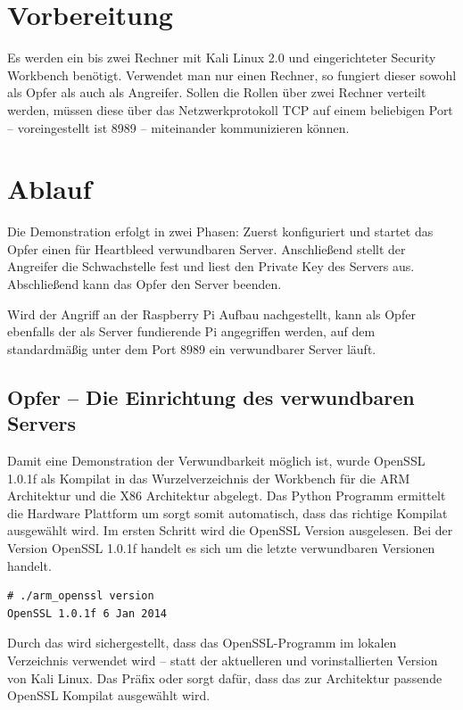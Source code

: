 \section{Vorbereitung}
%
Es werden ein bis zwei Rechner mit Kali Linux 2.0 und eingerichteter Security Workbench benötigt. Verwendet man nur einen Rechner, so fungiert dieser sowohl als Opfer als auch als Angreifer. Sollen die Rollen über zwei Rechner verteilt werden, müssen diese über das Netzwerkprotokoll TCP auf einem beliebigen Port -- voreingestellt ist 8989 -- miteinander kommunizieren können.

\section{Ablauf}
Die Demonstration erfolgt in zwei Phasen: Zuerst konfiguriert und startet das Opfer einen für Heartbleed verwundbaren Server. Anschließend stellt der Angreifer die Schwachstelle fest und liest den Private Key des Servers aus. Abschließend kann das Opfer den Server beenden.

Wird der Angriff an der Raspberry Pi Aufbau nachgestellt, kann als Opfer ebenfalls der als Server fundierende Pi angegriffen werden, auf dem standardmäßig unter dem Port 8989 ein verwundbarer Server läuft.

\subsection{Opfer -- Die Einrichtung des verwundbaren Servers}

Damit eine Demonstration der Verwundbarkeit möglich ist, wurde OpenSSL 1.0.1f als Kompilat in das Wurzelverzeichnis der Workbench für die ARM Architektur und die X86 Architektur abgelegt. Das Python Programm ermittelt die Hardware Plattform um sorgt somit automatisch, dass das richtige Kompilat ausgewählt wird.
%
Im ersten Schritt wird die OpenSSL Version ausgelesen. Bei der Version OpenSSL 1.0.1f handelt es sich um die letzte verwundbaren Versionen handelt.

\begin{lstlisting}
# ./arm_openssl version
OpenSSL 1.0.1f 6 Jan 2014
\end{lstlisting}

Durch das  wird sichergestellt, dass das OpenSSL-Programm im lokalen Verzeichnis verwendet wird -- statt der aktuelleren und vorinstallierten Version von Kali Linux. Das Präfix  oder  sorgt dafür, dass das zur Architektur passende OpenSSL Kompilat ausgewählt wird.

